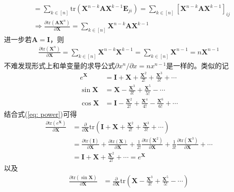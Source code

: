 \documentclass{ctexart}
\theoremstyle{definition}
\def \Av {\mathbf{A}}
\def \Ev {\mathbf{E}}
\def \Iv {\mathbf{I}}
\def \Xv {\mathbf{X}}
\def \tr {\mathrm{tr}}
\begin{document}
\begin{itemize}
\begin{align*}
                                                                               & = \sum_{k \in [n]} \tr ( \Xv^{n-k} \Av \Xv^{k-1} \Ev_{ji} ) = \sum_{k \in [n]} [\Xv^{n-k} \Av \Xv^{k-1}]_{ij}                                                                                                                                                         \\
                                                                               & \Longrightarrow \frac{\partial \tr(\Av \Xv^n)}{\partial \Xv} = \sum_{k \in [n]} \Xv^{n-k} \Av \Xv^{k-1}
          \end{align*}
          进一步若$\Av = \Iv$，则
          \begin{align*}
              \frac{\partial \tr(\Xv^n)}{\partial \Xv} = \sum_{k \in [n]} \Xv^{n-k} \Xv^{k-1} = \sum_{k \in [n]} \Xv^{n-1} = n \Xv^{n-1}
          \end{align*}
          不难发现形式上和单变量的求导公式$\partial x^n / \partial x = n x^{n-1}$是一样的。类似的记
          \begin{align*}
              e^{\Xv}  & = \Iv + \Xv + \frac{\Xv^2}{2!} + \frac{\Xv^3}{3!} + \cdots              \\
              \sin \Xv & = \Xv - \frac{\Xv^3}{3!} + \frac{\Xv^5}{5!} - \cdots                    \\
              \cos \Xv & = \Iv - \frac{\Xv^2}{2!} + \frac{\Xv^4}{4!} - \frac{\Xv^6}{6!} + \cdots
          \end{align*}
          结合式(\ref{eq: power})可得
          \begin{align*}
              \frac{\partial \tr(e^{\Xv})}{\partial \Xv} & = \frac{\partial }{\partial \Xv} \tr \left( \Iv + \Xv + \frac{\Xv^2}{2!} + \frac{\Xv^3}{3!} + \cdots \right)                                                                                                   \\
                                                         & = \frac{\partial \tr (\Iv)}{\partial \Xv} + \frac{\partial \tr (\Xv)}{\partial \Xv} + \frac{1}{2!} \frac{\partial \tr (\Xv^2)}{\partial \Xv} + \frac{1}{3!} \frac{\partial \tr (\Xv^3)}{\partial \Xv} + \cdots \\
                                                         & = \Iv + \Xv + \frac{\Xv^2}{2!} + \cdots = e^{\Xv}
          \end{align*}
          以及
          \begin{align*}
              \frac{\partial \tr(\sin \Xv)}{\partial \Xv} & = \frac{\partial }{\partial \Xv} \tr \left( \Xv - \frac{\Xv^3}{3!} + \frac{\Xv^5}{5!} - \cdots \right)                                                                                                                        \\

\end{align*}
\end{itemize}
\end{document}
